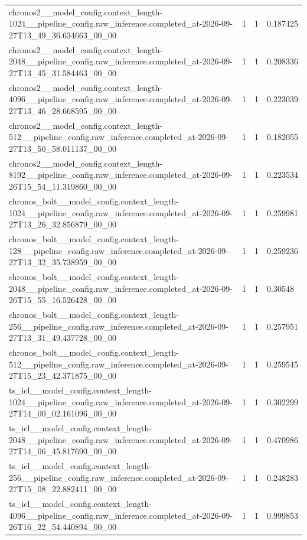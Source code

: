 \begin{tabular}{llll}
chronos2\_\_model\_config.context\_length-1024\_\_pipeline\_config.raw\_inference.completed\_at-2026-09-27T13\_49\_36.634663\_00\_00 & 1 & 1 & 0.187425 \\
chronos2\_\_model\_config.context\_length-2048\_\_pipeline\_config.raw\_inference.completed\_at-2026-09-27T13\_45\_31.584463\_00\_00 & 1 & 1 & 0.208336 \\
chronos2\_\_model\_config.context\_length-4096\_\_pipeline\_config.raw\_inference.completed\_at-2026-09-27T13\_46\_28.668595\_00\_00 & 1 & 1 & 0.223039 \\
chronos2\_\_model\_config.context\_length-512\_\_pipeline\_config.raw\_inference.completed\_at-2026-09-27T13\_50\_58.011137\_00\_00 & 1 & 1 & 0.182055 \\
chronos2\_\_model\_config.context\_length-8192\_\_pipeline\_config.raw\_inference.completed\_at-2026-09-26T15\_54\_11.319860\_00\_00 & 1 & 1 & 0.223534 \\
chronos\_bolt\_\_model\_config.context\_length-1024\_\_pipeline\_config.raw\_inference.completed\_at-2026-09-27T13\_26\_32.856879\_00\_00 & 1 & 1 & 0.259981 \\
chronos\_bolt\_\_model\_config.context\_length-128\_\_pipeline\_config.raw\_inference.completed\_at-2026-09-27T13\_32\_35.738959\_00\_00 & 1 & 1 & 0.259236 \\
chronos\_bolt\_\_model\_config.context\_length-2048\_\_pipeline\_config.raw\_inference.completed\_at-2026-09-26T15\_55\_16.526428\_00\_00 & 1 & 1 & 0.30548 \\
chronos\_bolt\_\_model\_config.context\_length-256\_\_pipeline\_config.raw\_inference.completed\_at-2026-09-27T13\_31\_49.437728\_00\_00 & 1 & 1 & 0.257951 \\
chronos\_bolt\_\_model\_config.context\_length-512\_\_pipeline\_config.raw\_inference.completed\_at-2026-09-27T15\_23\_42.371875\_00\_00 & 1 & 1 & 0.259545 \\
ts\_icl\_\_model\_config.context\_length-1024\_\_pipeline\_config.raw\_inference.completed\_at-2026-09-27T14\_00\_02.161096\_00\_00 & 1 & 1 & 0.302299 \\
ts\_icl\_\_model\_config.context\_length-2048\_\_pipeline\_config.raw\_inference.completed\_at-2026-09-27T14\_06\_45.817690\_00\_00 & 1 & 1 & 0.470986 \\
ts\_icl\_\_model\_config.context\_length-256\_\_pipeline\_config.raw\_inference.completed\_at-2026-09-27T15\_08\_22.882411\_00\_00 & 1 & 1 & 0.248283 \\
ts\_icl\_\_model\_config.context\_length-4096\_\_pipeline\_config.raw\_inference.completed\_at-2026-09-26T16\_22\_54.440894\_00\_00 & 1 & 1 & 0.999853 \\

\end{tabular}
